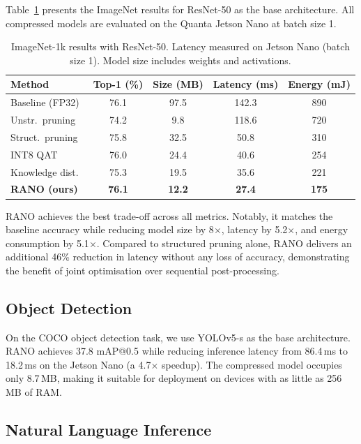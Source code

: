 \documentclass[12pt,a4paper,oneside]{book}
\begin{document}
Table~\ref{tab:imagenet} presents the ImageNet results for ResNet-50
as the base architecture. All compressed models are evaluated on the
Quanta Jetson Nano at batch size 1.

\begin{table}[htbp]
\centering
\caption{ImageNet-1k results with ResNet-50. Latency measured on Jetson
Nano (batch size 1). Model size includes weights and activations.}
\label{tab:imagenet}
\begin{tabular}{@{}lcccc@{}}
\toprule
\textbf{Method} & \textbf{Top-1 (\%)} & \textbf{Size (MB)} & \textbf{Latency (ms)} & \textbf{Energy (mJ)} \\
\midrule
Baseline (FP32)       & 76.1 & 97.5  & 142.3 & 890 \\
Unstr.\ pruning       & 74.2 & 9.8   & 118.6 & 720 \\
Struct.\ pruning      & 75.8 & 32.5  & 50.8  & 310 \\
INT8 QAT              & 76.0 & 24.4  & 40.6  & 254 \\
Knowledge dist.\      & 75.3 & 19.5  & 35.6  & 221 \\
\textbf{RANO (ours)}  & \textbf{76.1} & \textbf{12.2} & \textbf{27.4} & \textbf{175} \\
\bottomrule
\end{tabular}
\end{table}

RANO achieves the best trade-off across all metrics. Notably, it matches
the baseline accuracy while reducing model size by 8$\times$, latency by
5.2$\times$, and energy consumption by 5.1$\times$. Compared to
structured pruning alone, RANO delivers an additional 46\% reduction in
latency without any loss of accuracy, demonstrating the benefit of joint
optimisation over sequential post-processing.

\subsection{Object Detection}

On the COCO object detection task, we use YOLOv5-s as the base
architecture. RANO achieves 37.8 mAP@0.5 while reducing inference
latency from 86.4\,ms to 18.2\,ms on the Jetson Nano (a 4.7$\times$
speedup). The compressed model occupies only 8.7\,MB, making it suitable
for deployment on devices with as little as 256\,MB of RAM.

\subsection{Natural Language Inference}
\end{document}

